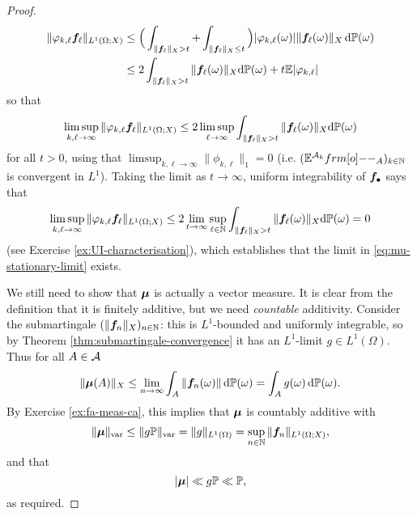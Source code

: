 \begin{proof}
\begin{equation*}
     \begin{aligned}
       \|  \varphi_{k,\ell}  \bm{f}_\ell \|_{L^1(\Omega;X)}
       &\leq \Big( \int_{\|\bm{f}_{\ell}\|_{X} > t} + \int_{\|\bm{f}_{\ell}\|_{X} \leq t} \Big) |\varphi_{k,\ell}(\omega)| \|\bm{f}_{\ell}(\omega)\|_{X} \, \mathrm{d}\mathbb{P}(\omega) \\
       &\leq  2\int_{\|\bm{f}_{\ell}\|_{X} > t} \|\bm{f}_{\ell}(\omega)\|_{X} \mathrm{d}\mathbb{P}(\omega) + t\mathbb{E}|\varphi_{k,\ell}| 
     \end{aligned}
   \end{equation*}
   so that
   \begin{equation*}
     \limsup_{k,\ell \to \infty} \|  \varphi_{k,\ell} \bm{f}_\ell  \|_{L^1(\Omega;X)}
     \leq 2\limsup_{\ell \to \infty} \int_{\|\bm{f}_{\ell}\|_{X} > t} \|\bm{f}_{\ell}(\omega)\|_{X} \mathrm{d}\mathbb{P}(\omega)
   \end{equation*}
   for all $t > 0$, using that $\limsup_{k,\ell \to \infty} \|\phi_{k,\ell}\|_{1} = 0$ (i.e. $(\E^{\mc{A}_{k}} \1_{A})_{k \in \N}$ is convergent in $L^1$).
   Taking the limit as $t \to \infty$, uniform integrability of $\bm{f}_{\bullet}$ says that
   \begin{equation*}
     \limsup_{k,\ell \to \infty} \|  \varphi_{k,\ell} \bm{f}_\ell  \|_{L^1(\Omega;X)}
     \leq 2\lim_{t \to \infty} \sup_{\ell \in \mathbb{N}} \int_{\|\bm{f}_{\ell}\|_{X} > t} \|\bm{f}_{\ell}(\omega)\|_{X} \mathrm{d}\mathbb{P}(\omega) = 0
   \end{equation*}
   (see Exercise \ref{ex:UI-characterisation}), which establishes that the limit in \eqref{eq:mu-stationary-limit} exists.

 We still need to show that $\bm{\mu}$ is actually a vector measure.
 It is clear from the definition that it is finitely additive, but we need \emph{countable} additivity.
 Consider the submartingale $(\|\bm{f}_n\|_{X})_{n \in \mathbb{N}}$: this is $L^1$-bounded and uniformly integrable, so by Theorem \ref{thm:submartingale-convergence} it has an $L^1$-limit $g \in L^1(\Omega)$.
 Thus for all $A \in \mathcal{A}$
 \begin{equation*}
   \|\bm{\mu}(A)\|_{X} \leq \lim_{n \to \infty} \int_{A} \|\bm{f}_n(\omega)\| \, \mathrm{d}\mathbb{P}(\omega) = \int_{A} g(\omega) \, \mathrm{d}\mathbb{P}(\omega).
 \end{equation*}
 By Exercise \ref{ex:fa-meas-ca}, this implies that $\bm{\mu}$ is countably additive with
 \begin{equation*}
   \|\bm{\mu}\|_{\mathrm{var}} \leq \|g\mathbb{P}\|_{\mathrm{var}} = \|g\|_{L^1(\Omega)} = \sup_{n \in \mathbb{N}} \|\bm{f}_n\|_{L^1(\Omega;X)},
 \end{equation*}
 and that
 \begin{equation*}
   |\bm{\mu}| \ll g\mathbb{P} \ll \mathbb{P},
 \end{equation*}
 as required.
\end{proof}


